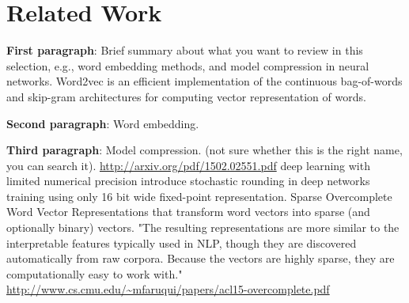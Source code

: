 \section{Related Work}
\label{sec:relatedwork}

{\bf First paragraph}: Brief summary about what you want to review in this selection, e.g., word embedding methods, and model compression in neural networks. Word2vec is an efficient implementation of  the continuous bag-of-words and skip-gram architectures for computing vector representation of words.
\cite{Mikolov132}\cite{MikolovYZ13}

{\bf Second paragraph}: Word embedding.

{\bf Third paragraph}: Model compression. (not sure whether this is the right name, you can search it).
\url{http://arxiv.org/pdf/1502.02551.pdf} deep learning with limited numerical precision introduce stochastic rounding in deep networks training using only 16 bit wide fixed-point representation. Sparse Overcomplete Word Vector Representations  that transform word vectors into sparse (and optionally binary) vectors. "The resulting representations are more similar to the interpretable features typically used in NLP, though they are discovered automatically from raw corpora. Because the vectors are highly sparse, they are computationally easy to work with." \url{http://www.cs.cmu.edu/~mfaruqui/papers/acl15-overcomplete.pdf} 
